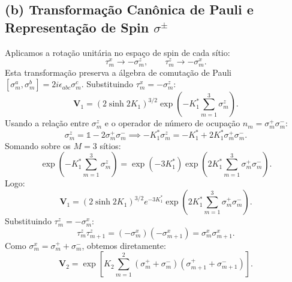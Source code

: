 \documentclass[11pt,a4paper]{article}
\begin{document}
\subsection*{(b) Transformação Canônica de Pauli e Representação de Spin $\sigma^\pm$}
%
Aplicamos a rotação unitária no espaço de spin de cada sítio:
%
\begin{equation}
    \tau_m^x \to -\sigma_m^z, \qquad \tau_m^z \to -\sigma_m^x.
    \label{eq:rot_pauli}
\end{equation}
%
Esta transformação preserva a álgebra de comutação de Pauli $[\sigma_m^a, \sigma_m^b] = 2i\epsilon_{abc}\sigma_m^c$. Substituindo $\tau_m^x = -\sigma_m^z$:
%
\begin{equation}
    \mathbf{V}_1 = (2\sinh 2K_1)^{3/2} \exp\left( -K_1^* \sum_{m=1}^{3} \sigma_m^z \right).
\end{equation}
%
Usando a relação entre $\sigma_m^z$ e o operador de número de ocupação $n_m = \sigma_m^+ \sigma_m^-$:
%
\begin{equation}
    \sigma_m^z = \mathbb{1} - 2\sigma_m^+ \sigma_m^- \implies -K_1^* \sigma_m^z = -K_1^* + 2K_1^* \sigma_m^+ \sigma_m^-.
\end{equation}
%
Somando sobre os $M=3$ sítios:
%
\begin{equation}
    \exp\left( -K_1^* \sum_{m=1}^3 \sigma_m^z \right) = \exp\left( -3K_1^* \right) \exp\left( 2K_1^* \sum_{m=1}^3 \sigma_m^+ \sigma_m^- \right).
\end{equation}
%
Logo:
%
\begin{equation}
    \boxed{\mathbf{V}_1 = (2\sinh 2K_1)^{3/2} e^{-3K_1^*} \exp\left( 2K_1^* \sum_{m=1}^{3} \sigma_m^+ \sigma_m^- \right).}
\end{equation}
%
Substituindo $\tau_m^z = -\sigma_m^x$:
%
\begin{equation}
    \tau_m^z \tau_{m+1}^z = (-\sigma_m^x)(-\sigma_{m+1}^x) = \sigma_m^x \sigma_{m+1}^x.
\end{equation}
%
Como $\sigma_m^x = \sigma_m^+ + \sigma_m^-$, obtemos diretamente:
%
\begin{equation}
    \boxed{\mathbf{V}_2 = \exp\left[ K_2 \sum_{m=1}^{2} (\sigma_m^+ + \sigma_m^-)(\sigma_{m+1}^+ + \sigma_{m+1}^-) \right].}
\end{equation}
%
\end{document}
